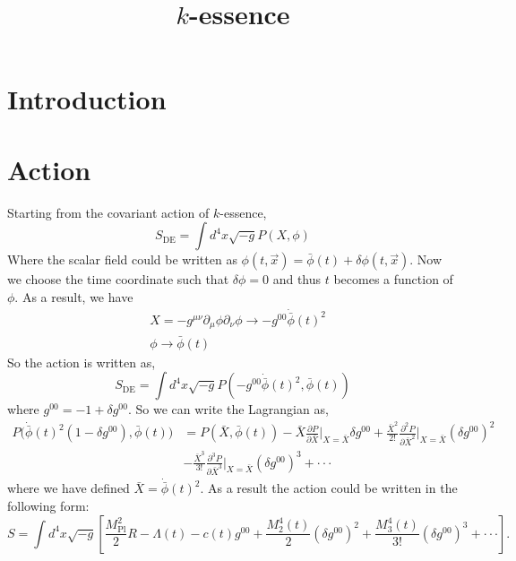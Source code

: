 \documentclass[a4paper,11pt]{article}
\title{$k$-essence}
\def\be{\begin{equation}}
\def\ee{\end{equation}}
\begin{document}
\maketitle

\section{Introduction}


\section{Action}

Starting from the covariant action of $k$-essence,
\be
S_{\mathrm{DE}}=\int d^{4} x \sqrt{-g} P(X, \phi)
\ee
Where the scalar field could be written as $\phi(t, \vec{x})=\bar{\phi}(t)+\delta \phi(t, \vec{x})$. Now we choose the time coordinate  such that $\delta \phi = 0$ and thus $t$ becomes a function of $\phi$. As a result, we have
\begin{align}
& X = - g^{\mu \nu} \partial_{\mu} \phi \partial_{\nu} \phi \to -g^{00} \dot{\bar{\phi}}(t)^2 \\ \nonumber &
\phi \to \bar{\phi}(t)
\end{align}
So the action is written as,
\be
S_{\mathrm{DE}}=\int d^{4} x \sqrt{-g} P(-g^{00} \dot{\bar{\phi}}(t)^2, \bar{\phi}(t))
\ee
where $g^{00} = -1 + \delta g^{00} $. So we can write the Lagrangian as,
\begin{align}
P \Big( \dot{\bar{\phi}}(t)^2 (1 - \delta g^{00}), \bar{\phi}(t) \Big)  & = P( \bar{X}, \bar{\phi}(t)) -  \bar{X} \frac{\partial P} {\partial \bar{X}}\bigg|_{X=\bar{X}}  \delta g^{00}  + \frac{ \bar{X}^2}{2!}\frac{\partial^2 P} {\partial \bar{X}^2}\bigg|_{X=\bar{X}}  ( \delta g^{00} )^2 \nonumber  \\ &  -  \frac{ \bar{X}^3}{3!}\frac{\partial^3 P} {\partial \bar{X}^3}\bigg|_{X=\bar{X}}  ( \delta g^{00} )^3 + \cdot \cdot \cdot
\end{align}
where we have defined $\bar{X} =\dot{\bar{\phi}}(t)^2 $. As a result the action could be written in the following form:
\be
S=\int d^{4} x \sqrt{-g}\left[\frac{M_{\mathrm{Pl}}^{2}}{2} R-\Lambda(t)-c(t) g^{00}+\frac{M_{2}^{4}(t)}{2}\left(\delta g^{00}\right)^{2}  +\frac{M_{3}^{4}(t)}{3!}\left(\delta g^{00}\right)^{3} + \cdot \cdot \cdot  \right].
\ee
\end{document}
